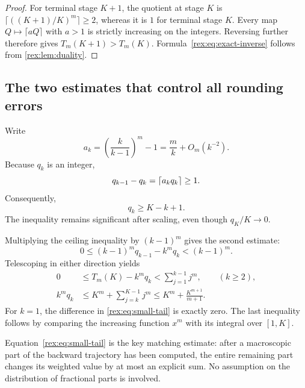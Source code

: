 \begin{proof}
For terminal stage $K+1$, the quotient at stage $K$ is
$\lceil((K+1)/K)^m\rceil\geq2$, whereas it is $1$ for terminal stage
$K$. Every map $Q\mapsto\lceil aQ\rceil$ with $a>1$ is strictly
increasing on the integers. Reversing further therefore gives
$T_m(K+1)>T_m(K)$. Formula~\eqref{rex:eq:exact-inverse} follows from
\cref{rex:lem:duality}.
\end{proof}

\subsection{The two estimates that control all rounding errors}

Write
\begin{equation}\label{rex:eq:ak}
 a_k=\left(\frac{k}{k-1}\right)^m-1
     =\frac{m}{k}+O_m(k^{-2}).
\end{equation}
Because $q_k$ is an integer,
\begin{equation}\label{rex:eq:increment}
 q_{k-1}-q_k=\left\lceil a_kq_k\right\rceil\geq1.
\end{equation}
Consequently,
\begin{equation}\label{rex:eq:positive-drift}
 q_k\geq K-k+1.
\end{equation}
The inequality remains significant after scaling, even though
$q_K/K\to0$.

Multiplying the ceiling inequality by $(k-1)^m$ gives the second estimate:
\begin{equation}\label{rex:eq:weighted-error}
 0\leq (k-1)^m q_{k-1}-k^m q_k<(k-1)^m.
\end{equation}
Telescoping in either direction yields
\begin{align}
 0&\leq T_m(K)-k^m q_k<\sum_{j=1}^{k-1}j^m,
       \qquad (k\geq2),\label{rex:eq:small-tail}\\
 k^m q_k&\leq K^m+\sum_{j=k}^{K-1}j^m
        \leq K^m+\frac{K^{m+1}}{m+1}.
        \label{rex:eq:global-bound}
\end{align}
For $k=1$, the difference in \cref{rex:eq:small-tail} is exactly zero.
The last inequality follows by comparing the increasing function $x^m$
with its integral over $[1,K]$.

Equation~\eqref{rex:eq:small-tail} is the key matching estimate: after a
macroscopic part of the backward trajectory has been computed, the
entire remaining part changes its weighted value by at most an explicit
sum. No assumption on the distribution of fractional parts is involved.

